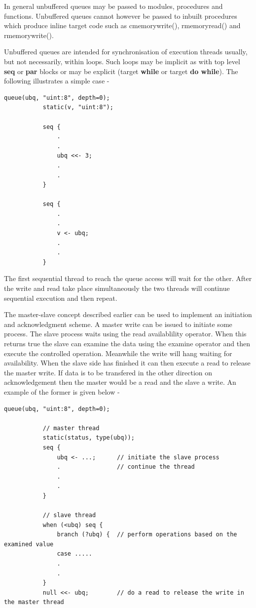         In general unbuffered queues may be passed to modules, procedures and
        functions. Unbuffered queues cannot however be passed to inbuilt
        procedures which produce inline target code such as cmemorywrite(),
        rmemoryread() and rmemorywrite().

        Unbuffered queues are intended for synchronisation of execution threads
        usually, but not necessarily, within loops. Such loops may be implicit
        as with top level {\bf seq} or {\bf par} blocks or may be explicit
        (target {\bf while} or target {\bf do while}). The following illustrates
        a simple case -
        
        \begin{lstlisting}[gobble=8, language=threepl]
           queue(ubq, "uint:8", depth=0);
           static(v, "uint:8");

           seq {
               .
               .
               ubq <<- 3;
               .
               .
           }

           seq {
               .
               .
               v <- ubq;
               .
               .
           }
        \end{lstlisting}
        
        The first sequential thread to reach the queue access will wait for
        the other. After the write and read take place simultaneously the
        two threads will continue sequential execution and then repeat.
        
        The master-slave concept described earlier can be used to implement
        an initiation and acknowledgment scheme. A master write can be issued
        to initiate some process. The slave process waits using the read
        availablility operator. When this returns true the slave can examine
        the data using the examine operator and then execute the controlled
        operation. Meanwhile the write will hang waiting for availability.
        When the slave side has finished it can then execute a read to release
        the master write. If data is to be transfered in the other direction
        on acknowledgement then the master would be a read and the slave a
        write. An example of the former is given below -
        
        \begin{lstlisting}[gobble=8, language=threepl]
           queue(ubq, "uint:8", depth=0);

           // master thread
           static(status, type(ubq));
           seq {
               ubq <- ...;      // initiate the slave process
               .                // continue the thread
               .
               .
           }

           // slave thread
           when (<ubq) seq {
               branch (?ubq) {  // perform operations based on the examined value
               case .....
               .
               .
           }
           null <<- ubq;        // do a read to release the write in the master thread
        \end{lstlisting}
        
